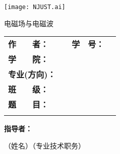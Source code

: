 \documentclass[twoside, openright]{report}
\numberwithin{Exercise}{chapter}
\numberwithin{Answer}{chapter}
\begin{document}

\newcommand{\Title}{电磁场与电磁波}

\begin{titlepage}
	\centering
	\begin{spacing}{1}
		\vspace{0.5\ccwd}

		\vspace{1\ccwd}

		\texttt{[image: NJUST.ai]}

		\vspace{0.2\ccwd}

		\fontsize{45pt}{45pt}\selectfont\heiti
		\Title

		\vspace{2\ccwd}
	\end{spacing}

	\begin{spacing}{1.5}
		\begin{tabu} to 12.59cm{@{}X[c, 3.2cm]@{}X[c, 4cm]@{}X[c, 2.22cm]@{}X[c, 3.89cm]@{}}
			\textbf{作　　者：} & \underline{} & \textbf{学　号：} & \underline{} \\
			\textbf{学　　院：} &  \\
			\textbf{专业(方向)：} &  \\
			\textbf{班　　级：} &  \\
			\textbf{题　　目：} &  \\
			\textbf{} & 
		\end{tabu}
		\vspace{0em}
	\end{spacing}

	\begin{spacing}{1}
		\vspace{3\ccwd}

		\textbf{指导者：}\underline{\makebox[15.5\ccwd][c]{}}

		\hspace{5em}（姓名）\hspace{11em}（专业技术职务）


\end{spacing}
\end{titlepage}
\end{document}
